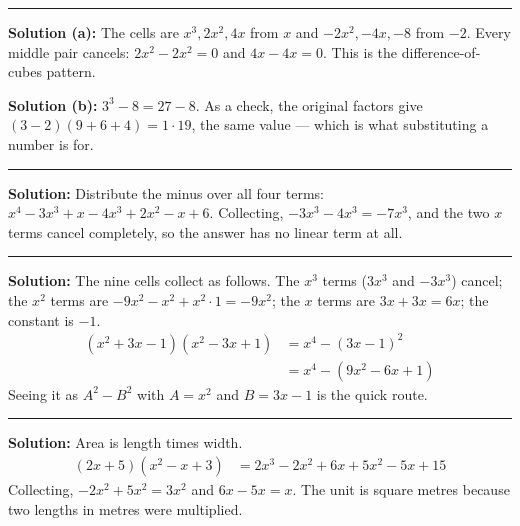 \documentclass[12pt]{article}
\begin{document}
\vspace{0.15cm}
\noindent\rule{\linewidth}{0.2pt}


\textbf{Solution (a):} The cells are $x^{3}, 2x^{2}, 4x$ from $x$ and
$-2x^{2}, -4x, -8$ from $-2$. Every middle pair cancels:
$2x^{2} - 2x^{2} = 0$ and $4x - 4x = 0$. This is the difference-of-cubes
pattern. 

\textbf{Solution (b):} $3^{3} - 8 = 27 - 8$. As a check, the original factors
give $(3 - 2)(9 + 6 + 4) = 1 \cdot 19$, the same value --- which is what
substituting a number is for. 

\vspace{0.15cm}
\noindent\rule{\linewidth}{0.2pt}


\textbf{Solution:} Distribute the minus over all four terms:
$x^{4} - 3x^{3} + x - 4x^{3} + 2x^{2} - x + 6$. Collecting,
$-3x^{3} - 4x^{3} = -7x^{3}$, and the two $x$ terms cancel completely, so the
answer has no linear term at all. 

\vspace{0.15cm}
\noindent\rule{\linewidth}{0.2pt}


\textbf{Solution:} The nine cells collect as follows. The $x^{3}$ terms
($3x^{3}$ and $-3x^{3}$) cancel; the $x^{2}$ terms are
$-9x^{2} - x^{2} + x^{2} \cdot 1 = -9x^{2}$; the $x$ terms are $3x + 3x = 6x$;
the constant is $-1$.
\begin{align*}
  (x^{2} + 3x - 1)(x^{2} - 3x + 1) &= x^{4} - (3x - 1)^{2} \\
                                   &= x^{4} - (9x^{2} - 6x + 1)
\end{align*}
Seeing it as $A^{2} - B^{2}$ with $A = x^{2}$ and $B = 3x - 1$ is the quick
route. 

\vspace{0.15cm}
\noindent\rule{\linewidth}{0.2pt}


\textbf{Solution:} Area is length times width.
\begin{align*}
  (2x + 5)(x^{2} - x + 3) &= 2x^{3} - 2x^{2} + 6x + 5x^{2} - 5x + 15
\end{align*}
Collecting, $-2x^{2} + 5x^{2} = 3x^{2}$ and $6x - 5x = x$. The unit is square
metres because two lengths in metres were multiplied. 
\end{document}
